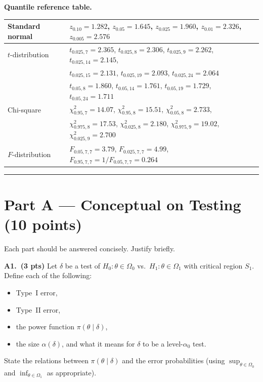 \documentclass[11pt]{article}
\begin{document}
\textbf{Quantile reference table.}
\begin{center}
\small
\begin{tabular}{ll}
\hline
Standard normal & $z_{0.10}=1.282$, $z_{0.05}=1.645$, $z_{0.025}=1.960$, $z_{0.01}=2.326$, $z_{0.005}=2.576$ \\
\hline
$t$-distribution &
$t_{0.025, 7}=2.365$, $t_{0.025, 8}=2.306$, $t_{0.025, 9}=2.262$, $t_{0.025, 14}=2.145$, \\
& $t_{0.025, 15}=2.131$, $t_{0.025, 19}=2.093$, $t_{0.025, 24}=2.064$ \\
& $t_{0.05, 8}=1.860$, $t_{0.05, 14}=1.761$, $t_{0.05, 19}=1.729$, $t_{0.05, 24}=1.711$ \\
\hline
Chi-square & $\chi^{2}_{0.95, 7}=14.07$, $\chi^{2}_{0.95, 8}=15.51$, $\chi^{2}_{0.05, 8}=2.733$, \\
&  $\chi^{2}_{0.975, 8}=17.53$, $\chi^{2}_{0.025, 8}=2.180$, $\chi^{2}_{0.975, 9}=19.02$, $\chi^{2}_{0.025, 9}=2.700$ \\
\hline
$F$-distribution & $F_{0.05, 7, 7}=3.79$, $F_{0.025, 7, 7}=4.99$, $F_{0.95, 7, 7}=1/F_{0.05, 7, 7}=0.264$ \\
\hline
\end{tabular}
\end{center}

\hrule

\vspace{0.8em}

\section*{Part A --- Conceptual on Testing (10 points)}

Each part should be answered concisely. Justify briefly.

\textbf{A1.\ (3 pts)} Let $\delta$ be a test of $H_0\!: \theta \in \Omega_0$ vs.\ $H_1\!: \theta \in \Omega_1$ with critical region $S_1$. Define each of the following:
\begin{itemize}[leftmargin=2em, itemsep=0pt]
    \item[(i)] Type~I error,
    \item[(ii)] Type~II error,
    \item[(iii)] the power function $\pi(\theta\mid\delta)$,
    \item[(iv)] the size $\alpha(\delta)$, and what it means for $\delta$ to be a level-$\alpha_0$ test.
\end{itemize}
State the relations between $\pi(\theta\mid\delta)$ and the error probabilities (using $\sup_{\theta\in\Omega_0}$ and $\inf_{\theta\in\Omega_1}$ as appropriate).
\end{document}
